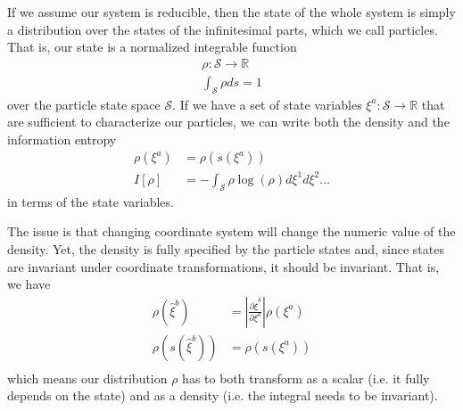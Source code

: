 \documentclass{ws-ijqi}
\begin{document}
If we assume our system is reducible, then the state of the whole system is simply a distribution over the states of the infinitesimal parts, which we call particles. That is, our state is a normalized integrable function
\begin{equation}
\begin{aligned}
	\rho : \mathcal{S} \to \mathbb{R} \\
	\int_{\mathcal{S}} \rho ds = 1
\end{aligned}
\end{equation}
over the particle state space $\mathcal{S}$. If we have a set of state variables $\xi^a : \mathcal{S} \to \mathbb{R}$ that are sufficient to characterize our particles, we can write both the density and the information entropy
\begin{equation}
\begin{aligned}
\rho(\xi^a) &= \rho(s(\xi^a)) \\
I[\rho] &= - \int_{\mathcal{S}} \rho \log (\rho) d\xi^1 d\xi^2 ...
\end{aligned}
\end{equation}
in terms of the state variables.

The issue is that changing coordinate system will change the numeric value of the density. Yet, the density is fully specified by the particle states and, since states are invariant under coordinate transformations, it should be invariant. That is, we have
\begin{equation}
\begin{aligned}
\rho(\hat{\xi}^b) &= \left| \frac{\partial \hat{\xi}^b}{\partial \xi^a} \right| \rho(\xi^a) \\
\rho(s(\hat{\xi}^b)) &= \rho(s(\xi^a)) \\
\end{aligned}
\end{equation}
which means our distribution $\rho$ has to both transform as a scalar (i.e. it fully depends on the state) and as a density (i.e. the integral needs to be invariant).
\end{document}

